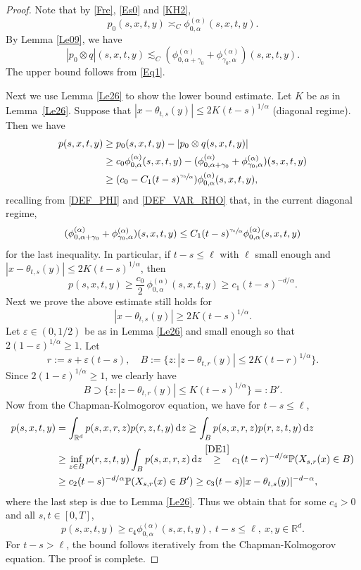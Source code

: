 \documentclass[JEP,XML,SOM,Unicode,published]{cedram}
\theoremstyle{plain}
\theoremstyle{definition}
\let\eps\varepsilon
\newcommand\mP{\mathbb{P}}
\newcommand\mR{\mathbb{R}}
\newcommand\1{{\mathbf{1}}}
\newcommand{\dif}{\,\mathrm{d}}
\begin{document}
\begin{proof}
Note that by \eqref{Fre}, \eqref{Es0} and \eqref{KH2},
\[
p_0(s,x,t,y)\asymp_C\phi^{(\alpha)}_{0,\alpha}(s,x,t,y).
\]
By Lemma \ref{Le09}, we have
\begin{equation*}
|p_0\otimes q|(s,x,t,y)
\lesssim_C(\phi^{(\alpha)}_{0,\alpha+\gamma_0}+\phi^{(\alpha)}_{\gamma_0,\alpha})(s,x,t,y).
\end{equation*}
The upper bound follows from \eqref{Eq1}.

Next we use Lemma \ref{Le26} to show the lower bound estimate. Let $K$ be as in Lem\-ma~\ref{Le26}.
Suppose that $|x-\theta_{t,s}(y)|\leq 2K(t-s)^{1/\alpha}$ {(diagonal regime)}. Then we have
\begin{align*}
p(s,x,t,y)&\geq p_0(s,x,t,y)-|p_0\otimes q(s,x,t,y)|
\\&\geq c_0\phi^{(\alpha)}_{0,\alpha}(s,x,t,y)-(\phi^{(\alpha)}_{0,\alpha+\gamma_0}+\phi^{(\alpha)}_{\gamma_0,\alpha})(s,x,t,y)
\\&\geq (c_0-C_1(t-s)^{\sfrac{\gamma_0}{\alpha}})\phi^{(\alpha)}_{0,\alpha}(s,x,t,y),
\end{align*}
{recalling from \eqref{DEF_PHI} and \eqref{DEF_VAR_RHO} that, in the current diagonal regime,
\[
(\phi^{(\alpha)}_{0,\alpha+\gamma_0}+\phi^{(\alpha)}_{\gamma_0,\alpha})(s,x,t,y)\le C_1(t-s)^{\sfrac{\gamma_0}{\alpha}}\phi^{(\alpha)}_{0,\alpha}(s,x,t,y)
\]
for the last inequality}.
In particular, if $t-s\leq\ell$ with $\ell$ small enough and $|x-\theta_{t,s}(y)|\leq 2K(t-s)^{1/\alpha}$, then
\begin{equation}\label{DE1}
p(s,x,t,y)\geq \frac{c_0}{2}\,\phi^{(\alpha)}_{0,\alpha}(s,x,t,y)\geq c_1(t-s)^{-d/\alpha}.
\end{equation}
Next we prove the above estimate still holds for
\[
|x-\theta_{t,s}(y)|\geq 2K(t-s)^{1/\alpha}.
\]
Let $\eps\in(0,1/2)$ be as in Lemma \ref{Le26} and small enough
so that $2(1-\eps)^{1/\alpha}\geq 1$. Let
\[
r:=s+\eps(t-s),\quad B:=\{z: |z-\theta_{t,r}(y)|\leq 2K(t-r)^{1/\alpha}\}.
\]
Since $2(1-\eps)^{1/\alpha}\geq 1$, we clearly have
\[
B\supset\{z: |z-\theta_{t,r}(y)|\leq K(t-s)^{1/\alpha}\}=:B'.
\]
Now from the Chapman-Kolmogorov equation, we have for $t-s\leq\ell$,
\begin{align*}
p(s,x,t,y)&=\int_{\mR^d}p(s,x,r,z)p(r,z,t,y)\dif z
\geq\int_B p(s,x,r,z)p(r,z,t,y)\dif z
\\&\geq\inf_{z\in B}p(r,z,t,y)\int_B p(s,x,r,z)\dif z
\stackrel{\eqref{DE1}}{\geq} c_1(t-r)^{-d/\alpha}\mP(X_{s,r}(x)\in B)
\\&\geq c_2(t-s)^{-d/\alpha}\mP(X_{s,r}(x)\in B')
\geq c_3(t-s)|x-\theta_{t,s}(y)|^{-d-\alpha},
\end{align*}
where the last step is due to Lemma \ref{Le26}.
Thus we obtain that for some $c_4>0$ and all $s,t\in[0,T]$,
\[
p(s,x,t,y)\geq c_4\phi^{(\alpha)}_{0,\alpha}(s,x,t,y),\ t-s\leq\ell, \ x,y\in\mR^d.
\]
For $t-s>\ell$, the bound follows iteratively from the Chapman-Kolmogorov equation.
The proof is complete.
\end{proof}
\end{document}
